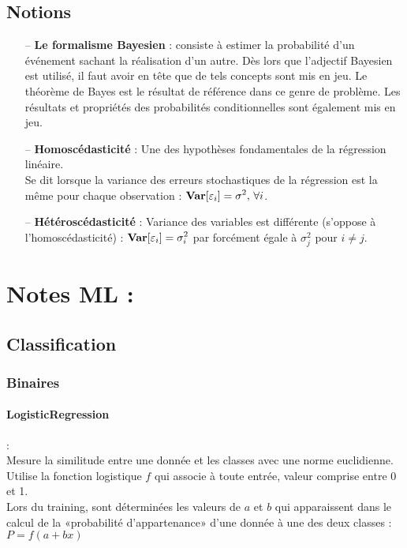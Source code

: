 \documentclass[a4paper,12pt]{report}
\newcommand{\bepar}[1]{
	\left( #1 \right)  
}
\newcommand\bk{\color{black}}
\newcommand\brick{\color{brick}}
\newcommand\navy{\color{navy}}
\numberwithin{equation}{section} %
\begin{document}
\newpage



\subsection{Notions}
\begin{itemize}
\item[--] \textbf{Le formalisme Bayesien} : consiste à estimer la probabilité d'un événement sachant la réalisation d'un autre. Dès lors que l'adjectif Bayesien est utilisé, il faut avoir en tête que de tels concepts sont mis en jeu. Le théorème de Bayes est le résultat de référence dans ce genre de problème. Les résultats et propriétés des probabilités conditionnelles sont également mis en jeu.
\item[--] \textbf{Homoscédasticité} : Une des hypothèses fondamentales de la régression linéaire. \\
Se dit lorsque la variance des erreurs stochastiques de la régression est la même pour chaque observation : $\displaystyle \text{\textbf{Var}}[\varepsilon_i] = \sigma^2, \, \forall i$.
\item[--] \textbf{Hétéroscédasticité} : Variance des variables est différente (s'oppose à l'homoscédasticité) : $\displaystyle \text{\textbf{Var}}[\varepsilon_i] = \sigma_i^2$ par forcément égale à $\sigma_j^2$ pour $i \neq j$.
\end{itemize}

\section{Notes ML : \cite{muller2016introduction}}
\brick \subsection{Classification}\bk
\subsubsection{Binaires}
\navy \paragraph*{LogisticRegression} :\bk \\
\noindent Mesure la similitude entre une donnée et les classes avec une norme euclidienne.\\
Utilise la fonction logistique $f$ qui associe à toute entrée, valeur comprise entre 0 et 1.\\
Lors du training, sont déterminées les valeurs de $a$ et $b$ qui apparaissent dans le calcul de la «probabilité d'appartenance» d'une donnée à une des deux classes : $P = f\bepar{a+bx}$\\
\end{document}
